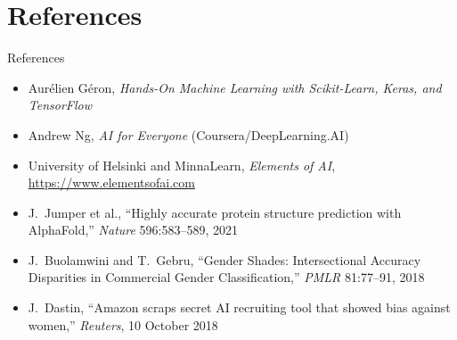 \section{References}
\begin{frame}{References}
    \begin{itemize}
        \setlength\itemsep{0.5em}
        \item Aurélien Géron, \textit{Hands-On Machine Learning with Scikit-Learn, Keras, and TensorFlow}
        \item Andrew Ng, \textit{AI for Everyone} (Coursera/DeepLearning.AI)
        \item University of Helsinki and MinnaLearn, \textit{Elements of AI}, \url{https://www.elementsofai.com}
        \item J.~Jumper et al., ``Highly accurate protein structure prediction with AlphaFold,'' \textit{Nature} 596:583--589, 2021
        \item J.~Buolamwini and T.~Gebru, ``Gender Shades: Intersectional Accuracy Disparities in Commercial Gender Classification,'' \textit{PMLR} 81:77--91, 2018
        \item J.~Dastin, ``Amazon scraps secret AI recruiting tool that showed bias against women,'' \textit{Reuters}, 10 October 2018
    \end{itemize}
\end{frame}

